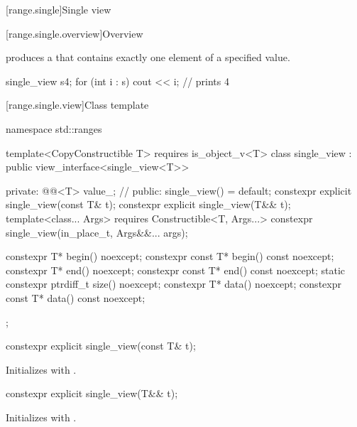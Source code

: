 [range.single]{Single view}

[range.single.overview]{Overview}

\pnum
{} produces a  that contains
exactly one element of a specified value.

\pnum
\begin{example}
\begin{codeblock}
single_view s{4};
for (int i : s)
  cout << i; // prints 4
\end{codeblock}
\end{example}

[range.single.view]{Class template }

\begin{codeblock}
namespace std::ranges {
  template<CopyConstructible T>
    requires is_object_v<T>
  class single_view : public view_interface<single_view<T>> {
  private:
    @@<T> value_;      // \expos
  public:
    single_view() = default;
    constexpr explicit single_view(const T& t);
    constexpr explicit single_view(T&& t);
    template<class... Args>
      requires Constructible<T, Args...>
    constexpr single_view(in_place_t, Args&&... args);

    constexpr T* begin() noexcept;
    constexpr const T* begin() const noexcept;
    constexpr T* end() noexcept;
    constexpr const T* end() const noexcept;
    static constexpr ptrdiff_t size() noexcept;
    constexpr T* data() noexcept;
    constexpr const T* data() const noexcept;
  };
}
\end{codeblock}

%
\begin{itemdecl}
constexpr explicit single_view(const T& t);
\end{itemdecl}

\begin{itemdescr}
\pnum
\effects Initializes  with .
\end{itemdescr}

%
\begin{itemdecl}
constexpr explicit single_view(T&& t);
\end{itemdecl}

\begin{itemdescr}
\pnum
\effects Initializes  with .
\end{itemdescr}

